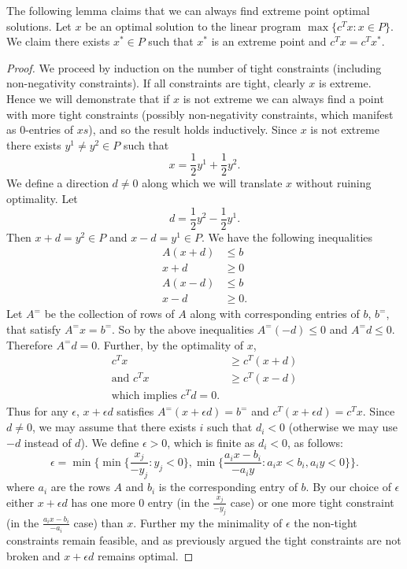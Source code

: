\begin{lemma}The following lemma claims that we can always find extreme point optimal solutions. Let $x$ be an optimal solution to the linear program $\max\{c^Tx : x \in P \}$. We claim there exists $x^* \in P$ such that $x^*$ is an extreme point and $c^Tx = c^Tx^*$.
\end{lemma}
\begin{proof}
We proceed by induction on the number of tight constraints (including non-negativity constraints). If all constraints are tight, clearly $x$ is extreme. Hence we will demonstrate that if $x$ is not extreme we can always find a point with more tight constraints (possibly non-negativity constraints, which manifest as $0$-entries of $xs$), and so the result holds inductively. Since $x$ is not extreme there exists $y^1 \neq y^2 \in P$ such that $$x = \frac{1}{2} y^1 + \frac{1}{2}y^2.$$
We define a direction $d\neq 0$ along which we will translate $x$ without ruining optimality. Let
$$ d = \frac{1}{2}y^2 - \frac{1}{2} y^1.$$
Then $x + d = y^2 \in P$ and $x - d = y^1 \in P$. We have the following inequalities
\begin{align*} A(x+d) &\leq b \\ x+d &\geq 0 \\
A(x-d) &\leq b \\ x-d &\geq 0 .\end{align*}
Let $A^=$ be the collection of rows of $A$ along with corresponding entries of $b$, $b^=$, that satisfy $A^= x = b^=$. So by the above inequalities $A^=(-d) \leq 0$ and $A^=d \leq 0$. Therefore $A^=d = 0$. Further, by the optimality of $x$,
\begin{align*}
c^Tx &\geq c^T(x+d) \\
\text{and } c^Tx &\geq c^T(x-d) \\
\text{which implies } c^Td = 0.
\end{align*}
Thus for any $\epsilon$, $x+\epsilon d$ satisfies $A^=(x+\epsilon d) = b^=$ and $c^T(x+\epsilon d) = c^Tx$. Since $d \neq 0$, we may assume that there exists $i$ such that $d_i < 0$ (otherwise we may use $-d$ instead of $d$). We define $\epsilon > 0$, which is finite as $d_i < 0$, as follows:
$$ \epsilon = \min\{ \min\{\frac{x_j}{-y_j}: y_j < 0\}, \min \{\frac{a_i x - b_i}{-a_iy}: a_i x < b_i, a_i y < 0 \}\}.$$
where $a_i$ are the rows $A$ and $b_i$ is the corresponding entry of $b$. By our choice of $\epsilon$ either $x+\epsilon d$ has one more $0$ entry (in the $\frac{x_j}{-y_j}$ case) or one more tight constraint (in the $\frac{a_i x - b_i}{-a_i}$ case) than $x$. Further my the minimality of $\epsilon$ the non-tight constraints remain feasible, and as previously argued the tight constraints are not broken and $x + \epsilon d$ remains optimal.
\end{proof}

